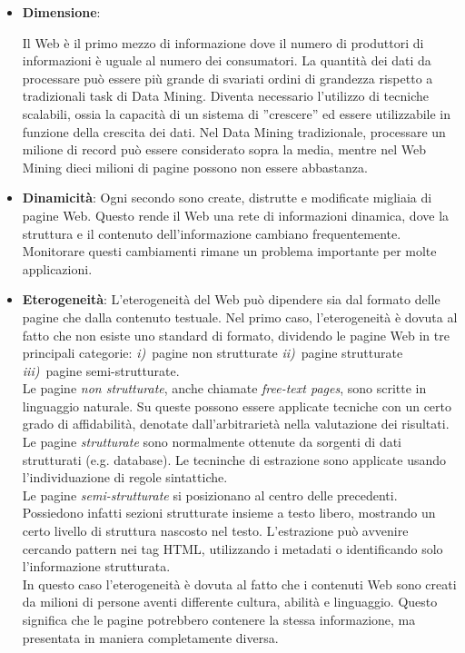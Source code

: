 \begin{itemize}
\item \textbf{Dimensione}: 

Il Web è il primo mezzo di informazione dove il numero di produttori di informazioni è uguale al numero dei consumatori. La quantità dei dati da processare può essere più grande di svariati ordini di grandezza rispetto a tradizionali task di Data Mining. Diventa necessario l'utilizzo di tecniche scalabili, ossia la capacità di un sistema di ''crescere'' ed essere utilizzabile in funzione della crescita dei dati. Nel Data Mining tradizionale, processare un milione di record può essere considerato sopra la media, mentre nel Web Mining dieci milioni di pagine possono non essere abbastanza. 

\item \textbf{Dinamicità}: 
Ogni secondo sono create, distrutte e modificate migliaia di pagine Web. Questo rende il Web una rete di informazioni dinamica, dove la struttura e il contenuto dell'informazione cambiano frequentemente. Monitorare questi cambiamenti rimane un problema importante per molte applicazioni.

\item \textbf{Eterogeneità}:
L'eterogeneità del Web può dipendere sia dal formato delle pagine che dalla contenuto testuale. Nel primo caso, l'eterogeneità è dovuta al fatto che non esiste uno standard di formato, dividendo le pagine Web in tre principali  categorie: \textit{i)}~pagine non strutturate \textit{ii)}~pagine strutturate \textit{iii)}~pagine semi-strutturate.
\\
Le pagine \textit{non strutturate}, anche chiamate \textit{free-text pages}, sono scritte in linguaggio naturale. Su queste possono essere applicate tecniche con un certo grado di affidabilità, denotate dall'arbitrarietà nella valutazione dei risultati.
\\
Le pagine \textit{strutturate} sono normalmente ottenute da sorgenti di dati strutturati (e.g. database). Le tecninche di estrazione sono applicate usando l'individuazione di regole sintattiche.
\\
Le pagine \textit{semi-strutturate} si posizionano al centro delle precedenti. Possiedono infatti sezioni strutturate insieme a testo libero, mostrando un certo livello di struttura nascosto nel testo. L'estrazione può avvenire cercando pattern nei tag HTML, utilizzando i metadati o identificando solo l'informazione strutturata.
\\
In questo caso l'eterogeneità è dovuta al fatto che i contenuti Web sono creati da milioni di persone aventi differente cultura, abilità e linguaggio. Questo significa che le pagine potrebbero contenere la stessa informazione, ma presentata in maniera completamente diversa.


\end{itemize}
